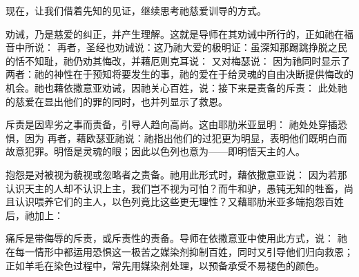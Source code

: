 现在，让我们借着先知的见证，继续思考祂慈爱训导的方式。\par

劝诫，乃是慈爱的纠正，并产生理解。这就是导师在其劝诫中所行的，正如祂在福音中所说： 再者，圣经也劝诫说：这乃祂大爱的极明证：虽深知那踢跳挣脱之民的恬不知耻，祂仍劝其悔改，并藉厄则克耳说： 又对梅瑟说： 因为祂同时显示了两者：祂的神性在于预知将要发生的事，祂的爱在于给灵魂的自由决断提供悔改的机会。祂也藉依撒意亚劝诫，因祂关心百姓，说：接下来是责备的斥责： 此处祂的慈爱在显出他们的罪的同时，也并列显示了救恩。\par

斥责是因卑劣之事而责备，引导人趋向高尚。这由耶肋米亚显明： 祂处处穿插恐惧，因为 再者，藉欧瑟亚祂说：祂指出他们的过犯更为明显，表明他们既明白而故意犯罪。明悟是灵魂的眼；因此以色列也意为——即明悟天主的人。\par

抱怨是对被视为藐视或忽略者之责备。祂用此形式时，藉依撒意亚说： 因为若那认识天主的人却不认识上主，我们岂不视为可怕？而牛和驴，愚钝无知的牲畜，尚且认识喂养它们的主人，以色列竟比这些更无理性？又藉耶肋米亚多端抱怨百姓后，祂加上：\par

痛斥是带侮辱的斥责，或斥责性的责备。导师在依撒意亚中使用此方式，说： 祂在每一情形中都运用恐惧这一极苦之媒染剂抑制百姓，同时又引导他们归向救恩；正如羊毛在染色过程中，常先用媒染剂处理，以预备承受不易褪色的颜色。\par

